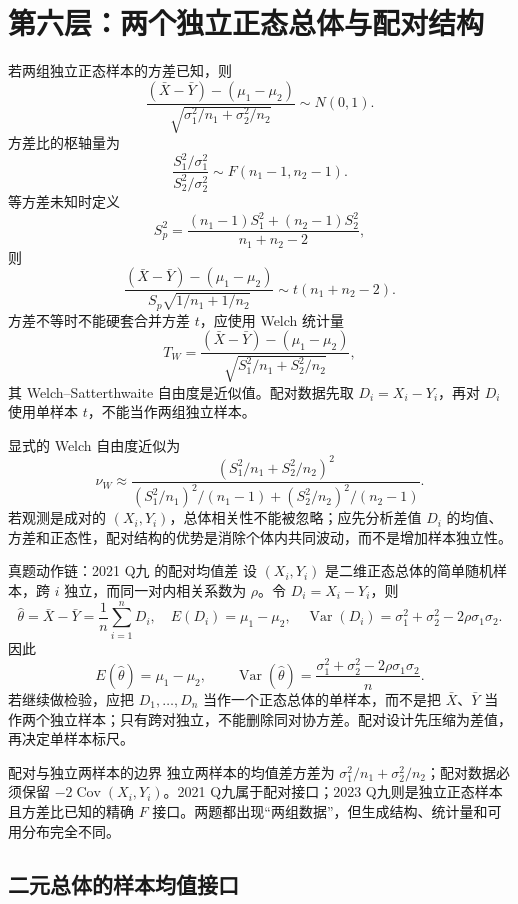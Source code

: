 \documentclass[11pt,a4paper]{ctexart}
\begin{document}
\section{第六层：两个独立正态总体与配对结构}

若两组独立正态样本的方差已知，则
\[
\frac{(\bar X-\bar Y)-(\mu_1-\mu_2)}{\sqrt{\sigma_1^2/n_1+\sigma_2^2/n_2}}\sim N(0,1).
\]
方差比的枢轴量为
\[
\frac{S_1^2/\sigma_1^2}{S_2^2/\sigma_2^2}\sim F(n_1-1,n_2-1).
\]
等方差未知时定义
\[
S_p^2=\frac{(n_1-1)S_1^2+(n_2-1)S_2^2}{n_1+n_2-2},
\]
则
\[
\frac{(\bar X-\bar Y)-(\mu_1-\mu_2)}{S_p\sqrt{1/n_1+1/n_2}}\sim t(n_1+n_2-2).
\]
方差不等时不能硬套合并方差 $t$，应使用 Welch 统计量
\[
T_W=\frac{(\bar X-\bar Y)-(\mu_1-\mu_2)}{\sqrt{S_1^2/n_1+S_2^2/n_2}},
\]
其 Welch--Satterthwaite 自由度是近似值。配对数据先取 $D_i=X_i-Y_i$，再对 $D_i$ 使用单样本 $t$，不能当作两组独立样本。

显式的 Welch 自由度近似为
\[
\nu_W\approx
\frac{(S_1^2/n_1+S_2^2/n_2)^2}
{(S_1^2/n_1)^2/(n_1-1)+(S_2^2/n_2)^2/(n_2-1)}.
\]
若观测是成对的 $(X_i,Y_i)$，总体相关性不能被忽略；应先分析差值 $D_i$ 的均值、方差和正态性，配对结构的优势是消除个体内共同波动，而不是增加样本独立性。

\begin{examplebox}{真题动作链：2021 Q九 的配对均值差}
设 $(X_i,Y_i)$ 是二维正态总体的简单随机样本，跨 $i$ 独立，而同一对内相关系数为 $\rho$。令 $D_i=X_i-Y_i$，则
\[
\hat\theta=\bar X-\bar Y=\frac1n\sum_{i=1}^nD_i,
\quad E(D_i)=\mu_1-\mu_2,
\quad \operatorname{Var}(D_i)=\sigma_1^2+\sigma_2^2-2\rho\sigma_1\sigma_2.
\]
因此
\[
E(\hat\theta)=\mu_1-\mu_2,
\qquad \operatorname{Var}(\hat\theta)=\frac{\sigma_1^2+\sigma_2^2-2\rho\sigma_1\sigma_2}{n}.
\]
若继续做检验，应把 $D_1,\ldots,D_n$ 当作一个正态总体的单样本，而不是把 $\bar X$、$\bar Y$ 当作两个独立样本；只有跨对独立，不能删除同对协方差。配对设计先压缩为差值，再决定单样本标尺。
\end{examplebox}

\begin{methodbox}{配对与独立两样本的边界}
独立两样本的均值差方差为 $\sigma_1^2/n_1+\sigma_2^2/n_2$；配对数据必须保留 $-2\operatorname{Cov}(X_i,Y_i)$。2021 Q九属于配对接口；2023 Q九则是独立正态样本且方差比已知的精确 $F$ 接口。两题都出现“两组数据”，但生成结构、统计量和可用分布完全不同。
\end{methodbox}

\subsection{二元总体的样本均值接口}
\end{document}
